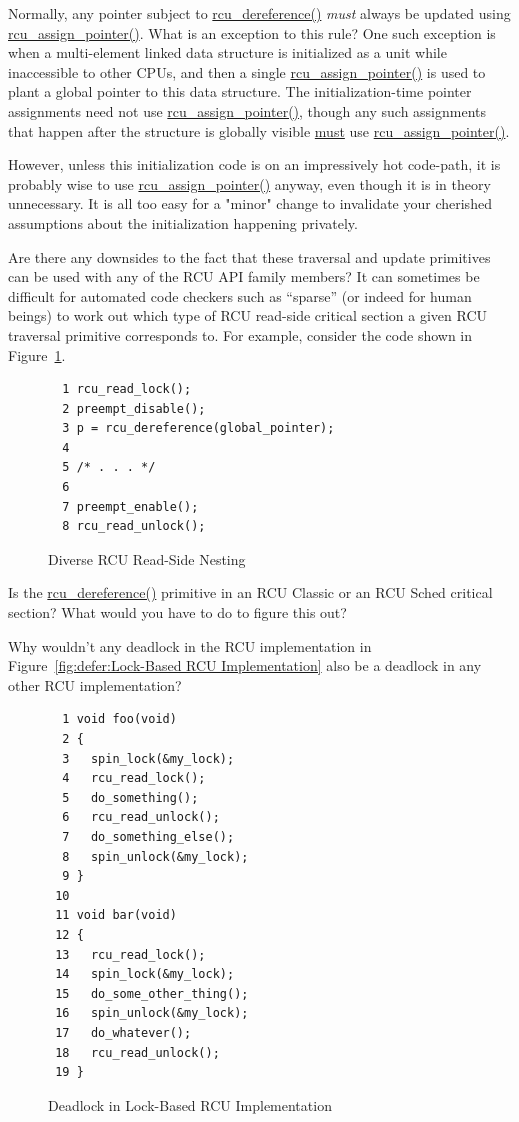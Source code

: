 \QuickQ{}
	Normally, any pointer subject to \url{rcu_dereference()} \emph{must}
	always be updated using \url{rcu_assign_pointer()}.
	What is an exception to this rule?
\QuickA{}
	One such exception is when a multi-element linked
	data structure is initialized as a unit while inaccessible to other
	CPUs, and then a single \url{rcu_assign_pointer()} is used
	to plant a global pointer to this data structure.
	The initialization-time pointer assignments need not use
	\url{rcu_assign_pointer()}, though any such assignments that
	happen after the structure is globally visible \url{must} use
	\url{rcu_assign_pointer()}.

	However, unless this initialization code is on an impressively hot
	code-path, it is probably wise to use \url{rcu_assign_pointer()}
	anyway, even though it is in theory unnecessary.
	It is all too easy for a "minor" change to invalidate your cherished
	assumptions about the initialization happening privately.

\QuickQ{}
	Are there any downsides to the fact that these traversal and update
	primitives can be used with any of the RCU API family members?
\QuickA{}
	It can sometimes be difficult for automated
	code checkers such as ``sparse'' (or indeed for human beings) to
	work out which type of RCU read-side critical section a given
	RCU traversal primitive corresponds to.
	For example, consider the code shown in
	Figure~\ref{fig:defer:Diverse RCU Read-Side Nesting}.

\begin{figure}[htbp]
{ \centering
\begin{verbatim}
  1 rcu_read_lock();
  2 preempt_disable();
  3 p = rcu_dereference(global_pointer);
  4
  5 /* . . . */
  6
  7 preempt_enable();
  8 rcu_read_unlock();
\end{verbatim}
}
\caption{Diverse RCU Read-Side Nesting}
\label{fig:defer:Diverse RCU Read-Side Nesting}
\end{figure}

	Is the \url{rcu_dereference()} primitive in an RCU Classic
	or an RCU Sched critical section?
	What would you have to do to figure this out?

\QuickQ{}
	Why wouldn't any deadlock in the RCU implementation in
	Figure~\ref{fig:defer:Lock-Based RCU Implementation}
	also be a deadlock in any other RCU implementation?
\QuickA{}

\begin{figure}[tbp]
{ \scriptsize
\begin{verbatim}
  1 void foo(void)
  2 {
  3   spin_lock(&my_lock);
  4   rcu_read_lock();
  5   do_something();
  6   rcu_read_unlock();
  7   do_something_else();
  8   spin_unlock(&my_lock);
  9 }
 10
 11 void bar(void)
 12 {
 13   rcu_read_lock();
 14   spin_lock(&my_lock);
 15   do_some_other_thing();
 16   spin_unlock(&my_lock);
 17   do_whatever();
 18   rcu_read_unlock();
 19 }
\end{verbatim}
}
\caption{Deadlock in Lock-Based RCU Implementation}
\label{fig:defer:Deadlock in Lock-Based RCU Implementation}
\end{figure}

